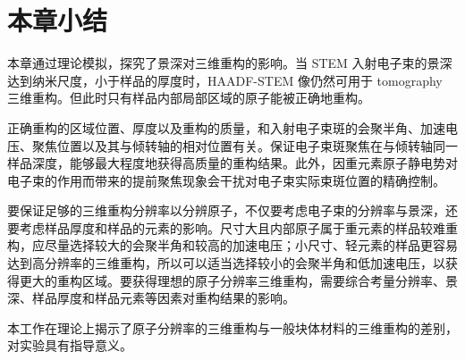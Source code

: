 \section{本章小结}
本章通过理论模拟，探究了景深对三维重构的影响。当 STEM 入射电子束的景深达到纳米尺度，小于样品的厚度时，HAADF-STEM 像仍然可用于 tomography 三维重构。但此时只有样品内部局部区域的原子能被正确地重构。

正确重构的区域位置、厚度以及重构的质量，和入射电子束斑的会聚半角、加速电压、聚焦位置以及其与倾转轴的相对位置有关。保证电子束斑聚焦在与倾转轴同一样品深度，能够最大程度地获得高质量的重构结果。此外，因重元素原子静电势对电子束的作用而带来的提前聚焦现象会干扰对电子束实际束斑位置的精确控制。

要保证足够的三维重构分辨率以分辨原子，不仅要考虑电子束的分辨率与景深，还要考虑样品厚度和样品的元素的影响。尺寸大且内部原子属于重元素的样品较难重构，应尽量选择较大的会聚半角和较高的加速电压；小尺寸、轻元素的样品更容易达到高分辨率的三维重构，所以可以适当选择较小的会聚半角和低加速电压，以获得更大的重构区域。要获得理想的原子分辨率三维重构，需要综合考量分辨率、景深、样品厚度和样品元素等因素对重构结果的影响。

本工作在理论上揭示了原子分辨率的三维重构与一般块体材料的三维重构的差别，对实验具有指导意义。


